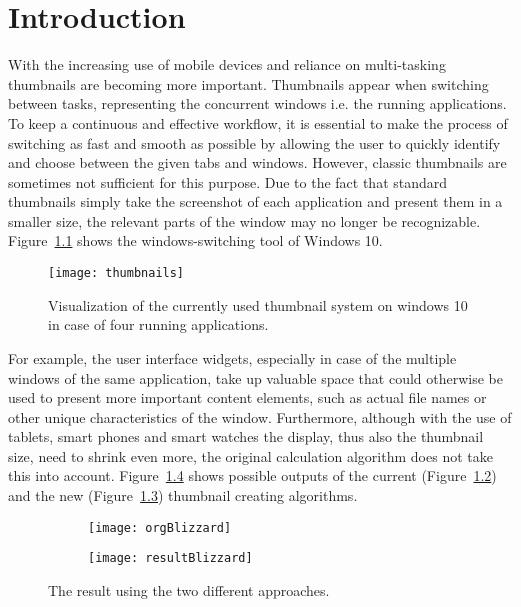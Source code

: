 \documentclass[draft,final]{vutinfth} %
\begin{document}
	\chapter{Introduction}
		With the increasing use of mobile devices and reliance on multi-tasking thumbnails are becoming more important.
	Thumbnails appear when switching between tasks, representing the concurrent windows i.e. the running applications.
	To keep a continuous and effective workflow, it is essential to make the process of switching as fast and smooth as possible by allowing the user to quickly identify and choose between the given tabs and windows. 
	However, classic thumbnails are sometimes not sufficient for this purpose. 
	Due to the fact that standard thumbnails simply take the screenshot of each application and present them in a smaller size, the relevant parts of the window may no longer be recognizable.
	Figure~\ref{fig:thumbnails} shows the windows-switching tool of Windows 10.
	\begin{figure}[H]
		\centering		
		\texttt{[image: thumbnails]}
		\caption{Visualization of the currently used thumbnail system on windows 10 in case of four running applications.}
		\label{fig:thumbnails}
	\end{figure} 
	For example, the user interface widgets, especially in case of the multiple windows of the same application, take up valuable space that could otherwise be used to present more important content elements, such as actual file names or other unique characteristics of the window.
	Furthermore, although with the use of tablets, smart phones and smart watches the display, thus also the thumbnail size, need to shrink even more, the original calculation algorithm does not take this into account.
	Figure~\ref{fig:introo} shows possible outputs of the current (Figure~\ref{fig:introo:org}) and the new (Figure~\ref{fig:introo:res}) thumbnail creating algorithms.\par 
	\begin{figure}[h]
		\centering
		\begin{subfigure}[b]{0.45\columnwidth}
			\centering
			\texttt{[image: orgBlizzard]}
			\label{fig:introo:org}
		\end{subfigure}
		\begin{subfigure}[b]{0.45\columnwidth}
			\centering
			\texttt{[image: resultBlizzard]}
			\label{fig:introo:res}
		\end{subfigure}
		\caption{The result using the two different approaches.}
		\label{fig:introo} %
	\end{figure}
\end{document}
